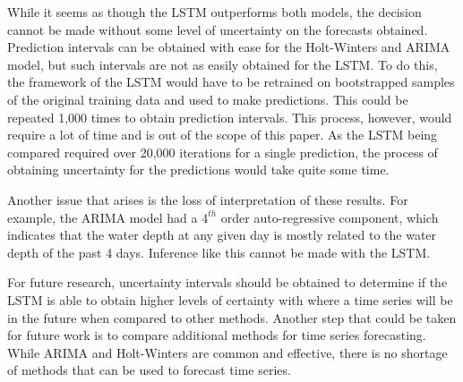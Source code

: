 While it seems as though the LSTM outperforms both models, the decision cannot be made without some level of uncertainty on the forecasts obtained. Prediction intervals can be obtained with ease for the Holt-Winters and ARIMA model, but such intervals are not as easily obtained for the LSTM. To do this, the framework of the LSTM would have to be retrained on bootstrapped samples of the original training data and used to make predictions. This could be repeated 1,000 times to obtain prediction intervals. This process, however, would require a lot of time and is out of the scope of this paper. As the LSTM being compared required over 20,000 iterations for a single prediction, the process of obtaining uncertainty for the predictions would take quite some time.

Another issue that arises is the loss of interpretation of these results. For example, the ARIMA model had a $4^{th}$ order auto-regressive component, which indicates that the water depth at any given day is mostly related to the water depth of the past 4 days. Inference like this cannot be made with the LSTM.

For future research, uncertainty intervals should be obtained to determine if the LSTM is able to obtain higher levels of certainty with where a time series will be in the future when compared to other methods. Another step that could be taken for future work is to compare additional methods for time series forecasting. While ARIMA and Holt-Winters are common and effective, there is no shortage of methods that can be used to forecast time series.
